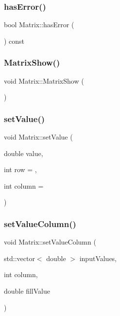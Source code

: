 \mbox{\label{classMatrix_abf6343d2b9345e08ef800fbc8f19e34e}} 
\subsubsection{\texorpdfstring{has\+Error()}{hasError()}}
{\footnotesize\ttfamily bool Matrix\+::has\+Error (\begin{DoxyParamCaption}{ }\end{DoxyParamCaption}) const}

\mbox{\label{classMatrix_a3c6fbdb8a8073ec2b2000614777ae930}} 
\subsubsection{\texorpdfstring{Matrix\+Show()}{MatrixShow()}}
{\footnotesize\ttfamily void Matrix\+::\+Matrix\+Show (\begin{DoxyParamCaption}{ }\end{DoxyParamCaption})\hspace{0.3cm}{\ttfamily [inline]}}

\mbox{\label{classMatrix_a8271fe6ec51ea43fdf77f4b7f96333d9}} 
\subsubsection{\texorpdfstring{set\+Value()}{setValue()}}
{\footnotesize\ttfamily void Matrix\+::set\+Value (\begin{DoxyParamCaption}\item[{double}]{value,  }\item[{int}]{row = {},  }\item[{int}]{column = {} }\end{DoxyParamCaption})}

\mbox{\label{classMatrix_ae33b973c97f6deed0f5936975c148aed}} 
\subsubsection{\texorpdfstring{set\+Value\+Column()}{setValueColumn()}\hspace{0.1cm}{\footnotesize\ttfamily [1/2]}}
{\footnotesize\ttfamily void Matrix\+::set\+Value\+Column (\begin{DoxyParamCaption}\item[{std\+::vector$<$ double $>$}]{input\+Values,  }\item[{int}]{column,  }\item[{double}]{fill\+Value }\end{DoxyParamCaption})}

